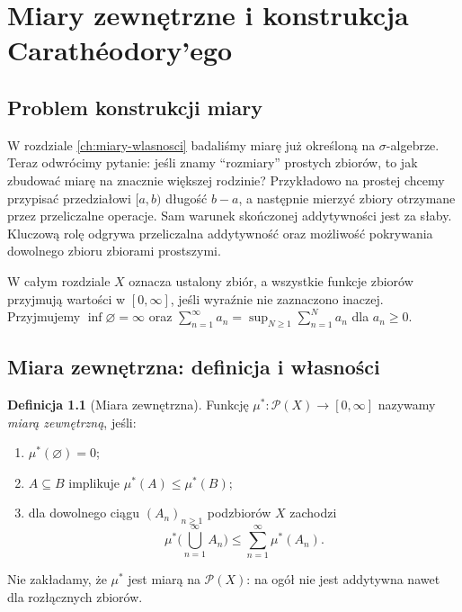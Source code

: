 \documentclass[11pt,a4paper,oneside]{book}
\numberwithin{equation}{chapter}
\theoremstyle{plain}
\theoremstyle{definition}
\newtheorem{definicja}[twierdzenie]{Definicja}
\theoremstyle{remark}
\begin{document}


\chapter{Miary zewnętrzne i konstrukcja Carathéodory'ego}
\label{ch:caratheodory}

\section{Problem konstrukcji miary}

W rozdziale \ref{ch:miary-wlasnosci} badaliśmy miarę już określoną na
$\sigma$-algebrze. Teraz odwrócimy pytanie: jeśli znamy ``rozmiary''
prostych zbiorów, to jak zbudować miarę na znacznie większej rodzinie?
Przykładowo na prostej chcemy przypisać przedziałowi $[a,b)$ długość
$b-a$, a następnie mierzyć zbiory otrzymane przez przeliczalne operacje.
Sam warunek skończonej addytywności jest za słaby. Kluczową rolę odgrywa
przeliczalna addytywność oraz możliwość pokrywania dowolnego zbioru
zbiorami prostszymi.

W całym rozdziale $X$ oznacza ustalony zbiór, a wszystkie funkcje
zbiorów przyjmują wartości w $[0,\infty]$, jeśli wyraźnie nie
zaznaczono inaczej. Przyjmujemy $\inf\varnothing=\infty$ oraz
$\sum_{n=1}^\infty a_n=\sup_{N\ge1}\sum_{n=1}^N a_n$ dla $a_n\ge0$.

\section{Miara zewnętrzna: definicja i własności}

\begin{definicja}[Miara zewnętrzna]
\label{def:outer-measure}
Funkcję $\mu^*:\mathcal P(X)\to[0,\infty]$ nazywamy
\emph{miarą zewnętrzną}, jeśli:
\begin{enumerate}[label=\textup{(\roman*)}]
\item $\mu^*(\varnothing)=0$;
\item $A\subseteq B$ implikuje $\mu^*(A)\le\mu^*(B)$;
\item dla dowolnego ciągu $(A_n)_{n\ge1}$ podzbiorów $X$ zachodzi
\begin{equation}\label{eq:outer-subadd}
\mu^*\Big(\bigcup_{n=1}^\infty A_n\Big)
\le\sum_{n=1}^\infty\mu^*(A_n).
\end{equation}
\end{enumerate}
Nie zakładamy, że $\mu^*$ jest miarą na $\mathcal P(X)$:
na ogół nie jest addytywna nawet dla rozłącznych zbiorów.
\end{definicja}
\end{document}

